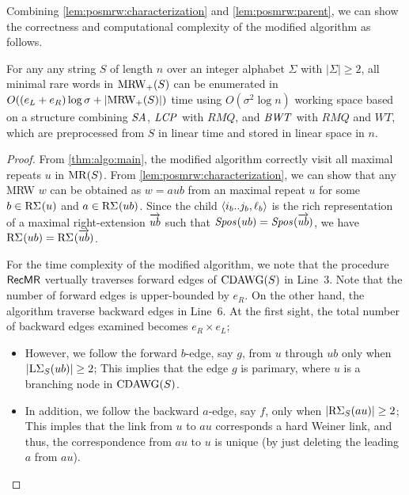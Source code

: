   Combining \cref{lem:posmrw:characterization} and  \cref{lem:posmrw:parent}, we can show the correctness and computational complexity of the modified algorithm as follows. 

\begin{theorem}\label{thm:algo:mrw}
  For any any string $S$ of length $n$ over an integer alphabet $\Sigma$ with $|\Sigma| \ge 2$, all minimal rare words in $\MRW_+(S)$ can be enumerated
  in $O((e_L + e_R)\log\sigma + |\MRW_+(S)|)$ time using
  $O(\sigma^2\log n)$ working space
  based on a structure combining $\SA$, $\LCP$ with $RMQ$, and $\BWT$ with $RMQ$  and $WT$,  which are preprocessed from $S$ in linear time and stored in linear space in $n$. 
\end{theorem}

\begin{proof}
  From \cref{thm:algo:main}, the modified algorithm correctly visit all maximal repeats $u$ in $\MR(S)$. From \cref{lem:posmrw:characterization},
we can show that any MRW $w$ can be obtained as $w = aub$ from an maximal repeat $u$ for some $b \in \RSigma[](u)$ and $a \in \RSigma[](ub)$. Since the child $\pair{i_b..j_b, \ell_b}$ is the rich representation of a maximal right-extension $\rext{ub}$ such that $\Spos[](ub) = \Spos[](\rext{ub})$, we have $\RSigma[](ub) = \RSigma[](\rext{ub})$. 

For the time complexity of the modified algorithm, we note that the procedure $\MRRec$ vertually traverses forward edges of $\CDAWG(S)$ in Line~3.
Note that the number of forward edges is upper-bounded by $e_R$.
On the other hand, the algorithm traverse backward edges in Line~6. At the first sight, the total number of backward edges examined becomes $e_R\times e_L$; 
\begin{itemize}
\item However, we follow the forward $b$-edge, say $g$, from $u$ through $ub$ only when $|\LSigma[S](ub)| \ge 2$; This implies that the edge $g$ is parimary, where $u$ is a branching node in $\CDAWG(S)$.
  
\item In addition, we follow the backward $a$-edge, say $f$, only when $|\RSigma[S](au)| \ge 2$; This imples that the link from $u$ to $au$ corresponds a hard Weiner link, and thus, the correspondence from $au$ to $u$ is unique (by just deleting the leading $a$ from $au$). 
\end{itemize}


\end{proof}
